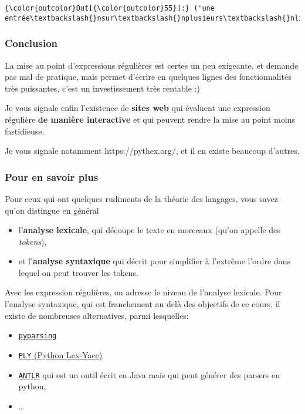 \begin{Verbatim}[commandchars=\\\{\},frame=single,framerule=0.3mm,rulecolor=\color{cellframecolor}]
{\color{outcolor}Out[{\color{outcolor}55}]:} ('une entrée\textbackslash{}nsur\textbackslash{}nplusieurs\textbackslash{}nlignes\textbackslash{}n',)
\end{Verbatim}
            
    \hypertarget{conclusion}{%
\subsubsection{Conclusion}\label{conclusion}}

    La mise au point d'expressions régulières est certes un peu exigeante,
et demande pas mal de pratique, mais permet d'écrire en quelques lignes
des fonctionnalités très puissantes, c'est un investissement très
rentable :)

    Je vous signale enfin l'existence de \textbf{sites web} qui évaluent une
expression régulière \textbf{de manière interactive} et qui peuvent
rendre la mise au point moins fastidieuse.

Je vous signale notamment https://pythex.org/, et il en existe beaucoup
d'autres.

    \hypertarget{pour-en-savoir-plus}{%
\subsubsection{Pour en savoir plus}\label{pour-en-savoir-plus}}

    Pour ceux qui ont quelques rudiments de la théorie des langages, vous
savez qu'on distingue en général

\begin{itemize}
\tightlist
\item
  l'\textbf{analyse lexicale}, qui découpe le texte en morceaux (qu'on
  appelle des \emph{tokens}),
\item
  et l'\textbf{analyse syntaxique} qui décrit pour simplifier à
  l'extrême l'ordre dans lequel on peut trouver les tokens.
\end{itemize}

Avec les expression régulières, on adresse le niveau de l'analyse
lexicale. Pour l'analyse syntaxique, qui est franchement au delà des
objectifs de ce cours, il existe de nombreuses alternatives, parmi
lesquelles:

\begin{itemize}
\tightlist
\item
  \href{http://pyparsing.wikispaces.com/Download+and+Installation}{\texttt{pyparsing}}
\item
  \href{http://www.dabeaz.com/ply/}{\texttt{PLY} (Python Lex-Yacc)}
\item
  \href{http://www.antlr.org}{\texttt{ANTLR}} qui est un outil écrit en
  Java mais qui peut générer des parsers en python,
\item
  \ldots{}
\end{itemize}


    
    
    
